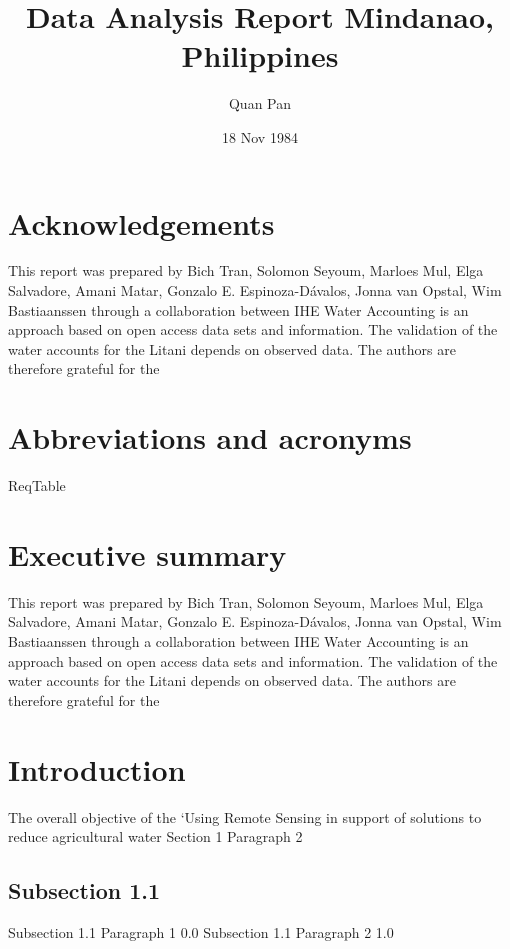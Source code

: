 \documentclass{article}%
\title{Data Analysis Report Mindanao, Philippines}%
\author{Quan Pan}%
\date{18 Nov 1984}%
\begin{document}
%
\normalsize%
\pagestyle{CoverPage}%
\newpage%
\pagestyle{FirstPage}%
\newpage%
\pagestyle{TOCPage}%
\clearpage%
\setcounter{page}{1}%
\pagestyle{ContentPage}%
\newpage%
\RaggedRight%
\section*{Acknowledgements}%
\label{sec:Acknowledgements}%
This report was prepared by Bich Tran, Solomon Seyoum, Marloes Mul, Elga Salvadore, Amani Matar, Gonzalo E. Espinoza{-}Dávalos, Jonna van Opstal, Wim Bastiaanssen through a collaboration between IHE%
\linebreak%
Water Accounting is an approach based on open access data sets and information. The validation of the water accounts for the Litani depends on observed data. The authors are therefore grateful for the%
\linebreak

%
\newpage%
\RaggedRight%
\section*{Abbreviations and acronyms}%
\label{sec:Abbreviationsandacronyms}%
ReqTable%
\linebreak

%
\newpage%
\RaggedRight%
\section*{Executive summary}%
\label{sec:Executivesummary}%
This report was prepared by Bich Tran, Solomon Seyoum, Marloes Mul, Elga Salvadore, Amani Matar, Gonzalo E. Espinoza{-}Dávalos, Jonna van Opstal, Wim Bastiaanssen through a collaboration between IHE%
\linebreak%
Water Accounting is an approach based on open access data sets and information. The validation of the water accounts for the Litani depends on observed data. The authors are therefore grateful for the%
\linebreak

%
\newpage%
\RaggedRight%
\section{Introduction}%
\label{sec:Introduction}%
The overall objective of the ‘Using Remote Sensing in support of solutions to reduce agricultural water %
\linebreak%
Section 1 Paragraph 2 %
\linebreak%
\subsection{Subsection 1.1}%
\label{subsec:Subsection1.1}%
Subsection 1.1 Paragraph 1 0.0%
\linebreak%
Subsection 1.1 Paragraph 2 1.0%
\linebreak
\end{document}
